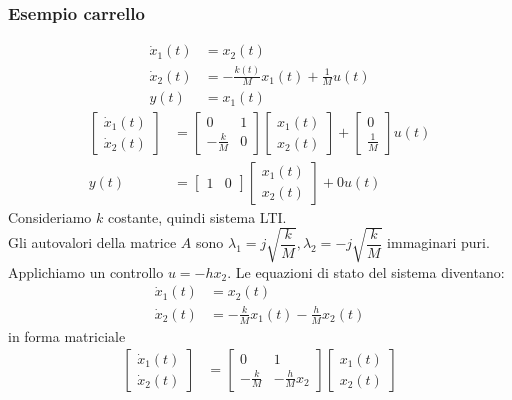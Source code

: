 \documentclass{article}
\numberwithin{equation}{subsection}
\begin{document}
\subsubsection{Esempio carrello}
\begin{align*}
    \dot x_1(t) &= x_2(t) \\
    \dot x_2(t) &= - \frac{k(t)}{M}x_1(t) + \frac{1}{M} u(t) \\
    y(t) &= x_1(t)
\end{align*}
\begin{align*}
    \begin{bmatrix}
        \dot x_1(t)\\
        \dot x_2(t)
    \end{bmatrix} &=
    \begin{bmatrix}
        0 & 1\\
        - \frac{k}{M} & 0
    \end{bmatrix}
    \begin{bmatrix}
        x_1(t)\\
        x_2(t)
    \end{bmatrix}
    +
    \begin{bmatrix}
        0\\
        \frac{1}{M}
    \end{bmatrix} u(t)
    \\
    y(t) &= \begin{bmatrix}
        1 & 0
    \end{bmatrix}
    \begin{bmatrix}
        x_1(t)\\
        x_2(t)
    \end{bmatrix} + 0 u(t)
\end{align*}
Consideriamo $k$ costante, quindi sistema LTI.\\
Gli autovalori della matrice $A$ sono $\lambda_1 = j \sqrt{\dfrac{k}{M}}, \lambda_2 = -j \sqrt{\dfrac{k}{M}}$ immaginari puri.
\vspace*{0.2cm}\\
Applichiamo un controllo $u = - hx_2$. Le equazioni di stato del sistema diventano:
\begin{align*}
    \dot x_1(t) &= x_2(t)\\
    \dot x_2(t) &= -\frac{k}{M}x_1(t) - \frac{h}{M}x_2(t)    
\end{align*}
in forma matriciale
\begin{align*}
    \begin{bmatrix}
        \dot x_1(t)\\
        \dot x_2(t)
    \end{bmatrix} &=
    \begin{bmatrix}
        0 & 1\\
        - \frac{k}{M} & -\frac{h}{M}x_2
    \end{bmatrix}
    \begin{bmatrix}
        x_1(t)\\
        x_2(t)
    \end{bmatrix}
\end{align*}
\end{document}
